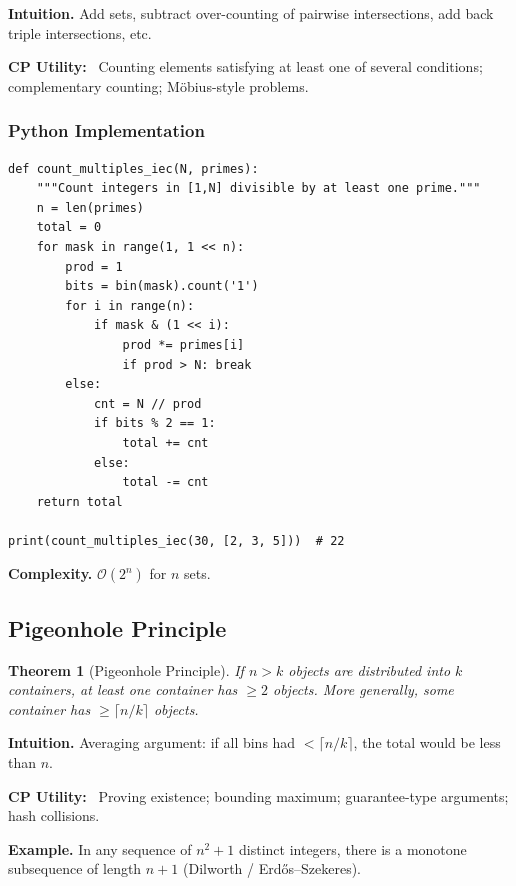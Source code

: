 \documentclass[10pt,a4paper]{article}
\theoremstyle{cpstyle}
\newtheorem{theorem}{Theorem}[section]
\newenvironment{cputility}{%
  \begin{mdframed}[backgroundcolor=theorembg, linecolor=accent!50, linewidth=1pt,
    innerleftmargin=10pt, innerrightmargin=10pt, innertopmargin=6pt, innerbottommargin=6pt]
  \textbf{\color{accent}CP Utility:}~}{%
  \end{mdframed}}
\newcommand{\bigO}[1]{\mathcal{O}\!\left(#1\right)}
\begin{document}
\textbf{Intuition.} Add sets, subtract over-counting of pairwise intersections, add back triple intersections, etc.

\begin{cputility}
Counting elements satisfying at least one of several conditions; complementary counting; Möbius-style problems.
\end{cputility}

\subsubsection{Python Implementation}
\begin{lstlisting}[caption={Inclusion-Exclusion -- count multiples of primes in [1,N]}]
def count_multiples_iec(N, primes):
    """Count integers in [1,N] divisible by at least one prime."""
    n = len(primes)
    total = 0
    for mask in range(1, 1 << n):
        prod = 1
        bits = bin(mask).count('1')
        for i in range(n):
            if mask & (1 << i):
                prod *= primes[i]
                if prod > N: break
        else:
            cnt = N // prod
            if bits % 2 == 1:
                total += cnt
            else:
                total -= cnt
    return total

print(count_multiples_iec(30, [2, 3, 5]))  # 22
\end{lstlisting}

\textbf{Complexity.} $\bigO{2^n}$ for $n$ sets.

\subsection{Pigeonhole Principle}

\begin{theorem}[Pigeonhole Principle]
If $n > k$ objects are distributed into $k$ containers, at least one container has $\geq 2$ objects. More generally, some container has $\geq \lceil n/k \rceil$ objects.
\end{theorem}

\textbf{Intuition.} Averaging argument: if all bins had $< \lceil n/k \rceil$, the total would be less than $n$.

\begin{cputility}
Proving existence; bounding maximum; guarantee-type arguments; hash collisions.
\end{cputility}

\textbf{Example.} In any sequence of $n^2+1$ distinct integers, there is a monotone subsequence of length $n+1$ (Dilworth / Erdős–Szekeres).
\end{document}
